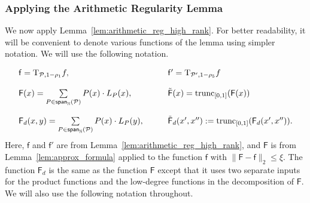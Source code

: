 \documentclass[10pt,a4paper]{amsart}
\newcommand\norm[1]{\| #1 \|}
\newcommand\Expect[2]{{\mathop{\mathbb{E}}_{#1}\left[ {#2} \right]}}
\newcommand\spn{{\sf span}_{\mathbb{N}}}
\renewcommand\leq{\leqslant}
\newcommand{\V}[1]{{#1}}
\begin{document}
\subsubsection{Applying the Arithmetic Regularity Lemma}
\label{sec:apply_arl}
We now apply Lemma~\ref{lem:arithmetic_reg_high_rank}. For better readability, it will be convenient to denote various functions of the lemma using simpler notation. We will use the following notation.


\newcommand{\noisyfcoarse}{\mathsf{f}}
\newcommand{\noisyfrefined}{\mathsf{f}'}
\newcommand{\fcoarsedecomposed}{{\mathsf{F}}}
\newcommand{\fcoarsedecoupled}{{\mathsf{F}_d}{}}
\newcommand{\truncfcoarsedecomposed}{\tilde{\mathsf{F}}}
\newcommand{\truncfcoarsedecoupled}{{\tilde{\mathsf{F}}_d}{}}
\newcommand{\truncmultilinfcoarsedecoupled}{{\widetilde{\mathsf{M}}_d}{}}
\newcommand{\multilinfcoarsedecoupled}{{{\mathsf{M}}_d}{}}


\begin{equation}
\label{eq:regularity_functions}
\begin{array}{ll}
   \noisyfcoarse = \mathrm{T}_{\mathcal{P},1-\rho_1}f,  &\quad\quad \noisyfrefined = \mathrm{T}_{\mathcal{P}',1-\rho_5}f\\ \\
   \fcoarsedecomposed(\V x)  = \sum\limits_{P\in \spn(\mathcal{P})}P(x)\cdot L_{P}(\V x), &\quad\quad\truncfcoarsedecomposed(\V x) = \mathrm{trunc}_{[0,1]}(\fcoarsedecomposed(\V x))\\ \\
   \fcoarsedecoupled(\V x, \V y)  = \sum\limits_{P\in \spn(\mathcal{P})}P(\V x)\cdot L_{P}(\V y), &\quad\quad\truncfcoarsedecoupled(\V x', \V x'') := \mathrm{trunc}_{[0,1]}(\fcoarsedecoupled(\V x', \V x'')).
\end{array}
\end{equation}
%
Here, $\noisyfcoarse$ 
and $\noisyfrefined$ are from Lemma~\ref{lem:arithmetic_reg_high_rank}, and $\fcoarsedecomposed$ is from Lemma~\ref{lem:approx_formula} applied to the function $\noisyfcoarse$ 
with
$\norm{\fcoarsedecomposed - \noisyfcoarse}_2 \leq \xi$. The function $\fcoarsedecoupled$ is the same as the function $\fcoarsedecomposed$ except that it uses two separate inputs for the product functions and the low-degree functions in the decomposition of $\fcoarsedecomposed$. We will also use the following notation throughout.\\
\end{document}
